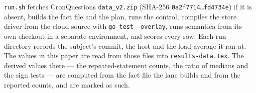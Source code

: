 \noindent \texttt{run.sh} fetches CronQuestions \texttt{data\_v2.zip} (SHA-256
\texttt{0a2f7714\ldots fd4734e}) if it is absent, builds the fact file and the
plan, runs the control, compiles the store driver from the cloud source with
\texttt{go test -overlay}, runs semantica from its own checkout in a separate
environment, and scores every row. Each run directory records the subject's
commit, the host and the load average it ran at. The values in this paper are
read from those files into \texttt{results-data.tex}. The derived values there
--- the repeated-statement counts, the ratio of medians and the sign tests ---
are computed from the fact file the lane builds and from the reported counts,
and are marked as such.

